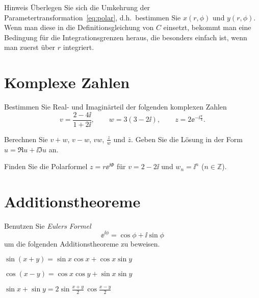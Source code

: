\documentclass{scrartcl}
\begin{document}
\begin{remark}{Hinweis}
  Überlegen Sie sich die Umkehrung der Parametertransformation~\eqref{eq:polar}, d.h.\ bestimmen Sie $x(r,\phi)$ und $y(r,\phi)$.
  Wenn man diese in die Definitionsgleichung von $C$ einsetzt, bekommt man eine Bedingung für die Integrationsgrenzen heraus, die besonders einfach ist, wenn man zuerst über $r$ integriert. 
\end{remark}


\section{Komplexe Zahlen }
\label{sec:komplexe_zahlen}

\begin{subex}
  \item{} Bestimmen Sie Real- und Imaginärteil der folgenden komplexen Zahlen
  \[
    v = \frac{2 - 4\ii}{1 + 2\ii}, \quad\quad w = 3(3 - 2\ii), \quad\quad z = 2 \ee^{-\ii \frac{\pi}{4}}.
  \]
  \item{} Berechnen Sie $v + w$, $v - w$, $vw$, $\frac{z}{w}$ und $\bar z$. 
  Geben Sie die Lösung in der Form $u = \Re u + \ii\Im u$ an.
  \item{} Finden Sie die Polarformel $z = r \ee^{\ii\Phi}$ für $v = 2 - 2\ii$ und $w_n = \ii^n$ ($n \in \mathbb{Z}$).
\end{subex}


\section{Additionstheoreme }
\label{sec:additionstheoreme}

Benutzen Sie \emph{Eulers Formel}
\[
  \ee^{\ii \phi} = \cos \phi + \ii \sin \phi 
\]
um die folgenden Additionstheoreme zu beweisen.

\begin{subex} 
  \item{} $\sin(x + y) = \sin x \cos x + \cos x \sin y$
  \item{} $\cos(x - y) = \cos x \cos y + \sin x \sin y$
  \item{} $\sin x + \sin y = 2 \sin \frac{x + y}{2} \, \cos \frac{x - y}{2}$
\end{subex}
\end{document}
